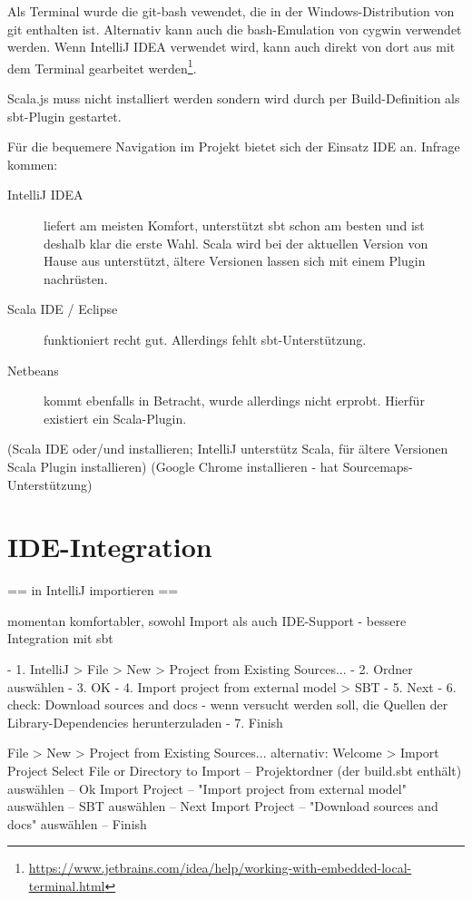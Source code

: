 \documentclass[a4paper, 12pt, hidelinks, listof=totoc, listoftables=totoc, bibliography=totoc]{scrreprt}
\begin{document}
Als Terminal wurde die git-bash vewendet, die in der Windows-Distribution von git enthalten ist. Alternativ kann auch die bash-Emulation von cygwin verwendet werden. Wenn IntelliJ IDEA verwendet wird, kann auch direkt von dort aus mit dem Terminal gearbeitet werden\footnote{\url{https://www.jetbrains.com/idea/help/working-with-embedded-local-terminal.html}}.

Scala.js muss nicht installiert werden sondern wird durch per Build-Definition als sbt-Plugin gestartet.

Für die bequemere Navigation im Projekt bietet sich der Einsatz IDE an. Infrage kommen:

\begin{description}
	\item[IntelliJ IDEA] liefert am meisten Komfort, unterstützt sbt schon am besten und ist deshalb klar die erste Wahl. Scala wird bei der aktuellen Version von Hause aus unterstützt, ältere Versionen lassen sich mit einem Plugin nachrüsten.
	\item[Scala IDE / Eclipse] funktioniert recht gut. Allerdings fehlt sbt-Unterstützung.
	\item[Netbeans] kommt ebenfalls in Betracht, wurde allerdings nicht erprobt. Hierfür existiert ein Scala-Plugin.
\end{description}


(Scala IDE oder/und  installieren; IntelliJ unterstütz Scala, für ältere Versionen Scala Plugin installieren)
(Google Chrome installieren - hat Sourcemaps-Unterstützung)



\section{IDE-Integration}

== in IntelliJ importieren ==

momentan komfortabler, sowohl Import als auch IDE-Support
	- bessere Integration mit sbt

- 1. IntelliJ > File > New > Project from Existing Sources...
- 2. Ordner auswählen
- 3. OK
- 4. Import project from external model > SBT
- 5. Next
- 6. check: Download sources and docs - wenn versucht werden soll, die Quellen der Library-Dependencies herunterzuladen
- 7. Finish

File > New > Project from Existing Sources...
alternativ: Welcome > Import Project
Select File or Directory to Import -- Projektordner (der build.sbt enthält) auswählen -- Ok
Import Project -- "Import project from external model" auswählen -- SBT auswählen -- Next
Import Project -- "Download sources and docs" auswählen -- Finish
\end{document}
